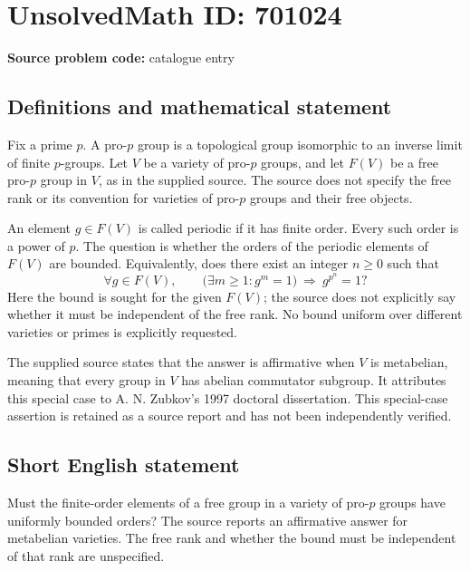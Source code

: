 \documentclass[11pt]{article}
\begin{document}
\section*{UnsolvedMath ID: 701024}
\textbf{Source problem code:} catalogue entry
\subsection{Definitions and mathematical statement}
Fix a prime \(p\). A pro-\(p\) group is a topological group isomorphic to an inverse limit of finite \(p\)-groups. Let \(V\) be a variety of pro-\(p\) groups, and let \(F(V)\) be a free pro-\(p\) group in \(V\), as in the supplied source. The source does not specify the free rank or its convention for varieties of pro-\(p\) groups and their free objects.

An element \(g\in F(V)\) is called periodic if it has finite order. Every such order is a power of \(p\). The question is whether the orders of the periodic elements of \(F(V)\) are bounded. Equivalently, does there exist an integer \(n\geq 0\) such that
\[
\forall g\in F(V),\qquad
\bigl(\exists m\geq 1\colon g^m=1\bigr)
\ \Longrightarrow\ g^{p^n}=1?
\]
Here the bound is sought for the given \(F(V)\); the source does not explicitly say whether it must be independent of the free rank. No bound uniform over different varieties or primes is explicitly requested.

The supplied source states that the answer is affirmative when \(V\) is metabelian, meaning that every group in \(V\) has abelian commutator subgroup. It attributes this special case to A. N. Zubkov's 1997 doctoral dissertation. This special-case assertion is retained as a source report and has not been independently verified.
\subsection{Short English statement}
Must the finite-order elements of a free group in a variety of pro-\(p\) groups have uniformly bounded orders? The source reports an affirmative answer for metabelian varieties. The free rank and whether the bound must be independent of that rank are unspecified.
\end{document}
